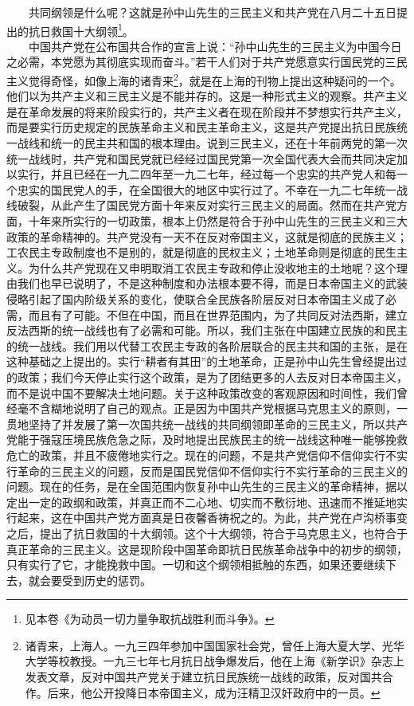 \documentclass[cn,11pt,chinese]{elegantbook}
\begin{document}
　　共同纲领是什么呢？这就是孙中山先生的三民主义和共产党在八月二十五日提出的抗日救国十大纲领\footnote[10]{ 见本卷《为动员一切力量争取抗战胜利而斗争》。}。\\
　　中国共产党在公布国共合作的宣言上说：“孙中山先生的三民主义为中国今日之必需，本党愿为其彻底实现而奋斗。”若干人们对于共产党愿意实行国民党的三民主义觉得奇怪，如像上海的诸青来\footnote[11]{ 诸青来，上海人。一九三四年参加中国国家社会党，曾任上海大夏大学、光华大学等校教授。一九三七年七月抗日战争爆发后，他在上海《新学识》杂志上发表文章，反对中国共产党关于建立抗日民族统一战线的政策，反对国共合作。后来，他公开投降日本帝国主义，成为汪精卫汉奸政府中的一员。}，就是在上海的刊物上提出这种疑问的一个。他们以为共产主义和三民主义是不能并存的。这是一种形式主义的观察。共产主义是在革命发展的将来阶段实行的，共产主义者在现在阶段并不梦想实行共产主义，而是要实行历史规定的民族革命主义和民主革命主义，这是共产党提出抗日民族统一战线和统一的民主共和国的根本理由。说到三民主义，还在十年前两党的第一次统一战线时，共产党和国民党就已经经过国民党第一次全国代表大会而共同决定加以实行，并且已经在一九二四年至一九二七年，经过每一个忠实的共产党人和每一个忠实的国民党人的手，在全国很大的地区中实行过了。不幸在一九二七年统一战线破裂，从此产生了国民党方面十年来反对实行三民主义的局面。然而在共产党方面，十年来所实行的一切政策，根本上仍然是符合于孙中山先生的三民主义和三大政策的革命精神的。共产党没有一天不在反对帝国主义，这就是彻底的民族主义；工农民主专政制度也不是别的，就是彻底的民权主义；土地革命则是彻底的民生主义。为什么共产党现在又申明取消工农民主专政和停止没收地主的土地呢？这个理由我们也早已说明了，不是这种制度和办法根本要不得，而是日本帝国主义的武装侵略引起了国内阶级关系的变化，使联合全民族各阶层反对日本帝国主义成了必需，而且有了可能。不但在中国，而且在世界范围内，为了共同反对法西斯，建立反法西斯的统一战线也有了必需和可能。所以，我们主张在中国建立民族的和民主的统一战线。我们用以代替工农民主专政的各阶层联合的民主共和国的主张，是在这种基础之上提出的。实行“耕者有其田”的土地革命，正是孙中山先生曾经提出过的政策；我们今天停止实行这个政策，是为了团结更多的人去反对日本帝国主义，而不是说中国不要解决土地问题。关于这种政策改变的客观原因和时间性，我们曾经毫不含糊地说明了自己的观点。正是因为中国共产党根据马克思主义的原则，一贯地坚持了并发展了第一次国共统一战线的共同纲领即革命的三民主义，所以共产党能于强寇压境民族危急之际，及时地提出民族民主的统一战线这种唯一能够挽救危亡的政策，并且不疲倦地实行之。现在的问题，不是共产党信仰不信仰实行不实行革命的三民主义的问题，反而是国民党信仰不信仰实行不实行革命的三民主义的问题。现在的任务，是在全国范围内恢复孙中山先生的三民主义的革命精神，据以定出一定的政纲和政策，并真正而不二心地、切实而不敷衍地、迅速而不推延地实行起来，这在中国共产党方面真是日夜馨香祷祝之的。为此，共产党在卢沟桥事变之后，提出了抗日救国的十大纲领。这个十大纲领，符合于马克思主义，也符合于真正革命的三民主义。这是现阶段中国革命即抗日民族革命战争中的初步的纲领，只有实行了它，才能挽救中国。一切和这个纲领相抵触的东西，如果还要继续下去，就会要受到历史的惩罚。\\
\end{document}
